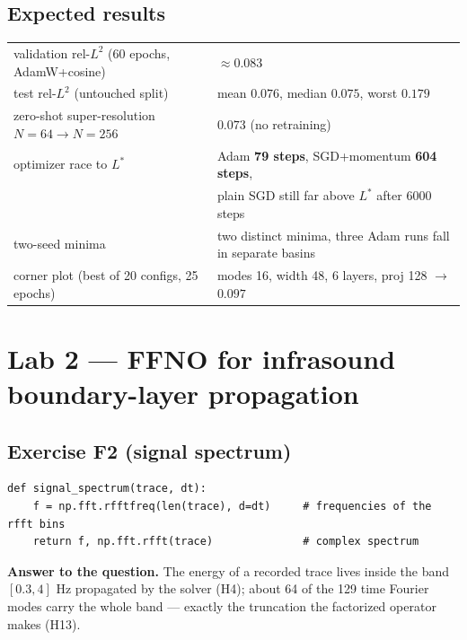 \documentclass[11pt,a4paper]{article}
\begin{document}
\subsection*{Expected results}
\begin{center}
\begin{tabular}{@{}ll@{}}
\toprule
validation rel-$L^2$ (60 epochs, AdamW+cosine) & $\approx 0.083$\\
test rel-$L^2$ (untouched split) & mean $0.076$, median $0.075$, worst $0.179$\\
zero-shot super-resolution $N{=}64\to N{=}256$ & $0.073$ (no retraining)\\
optimizer race to $L^*$ & Adam \textbf{79 steps}, SGD+momentum \textbf{604 steps},\\
 & plain SGD still far above $L^*$ after 6000 steps\\
two-seed minima & two distinct minima, three Adam runs fall in separate basins\\
corner plot (best of 20 configs, 25 epochs) & modes 16, width 48, 6 layers, proj 128 $\to$ $0.097$\\
\bottomrule
\end{tabular}
\end{center}

\section{Lab 2 --- FFNO for infrasound boundary-layer propagation}

\subsection*{Exercise F2 (signal spectrum)}
\begin{lstlisting}
def signal_spectrum(trace, dt):
    f = np.fft.rfftfreq(len(trace), d=dt)     # frequencies of the rfft bins
    return f, np.fft.rfft(trace)              # complex spectrum
\end{lstlisting}
\textbf{Answer to the question.} The energy of a recorded trace lives inside the band
$[0.3, 4]$ Hz propagated by the solver (H4); about 64 of the 129 time Fourier modes carry the
whole band --- exactly the truncation the factorized operator makes (H13).
\end{document}

